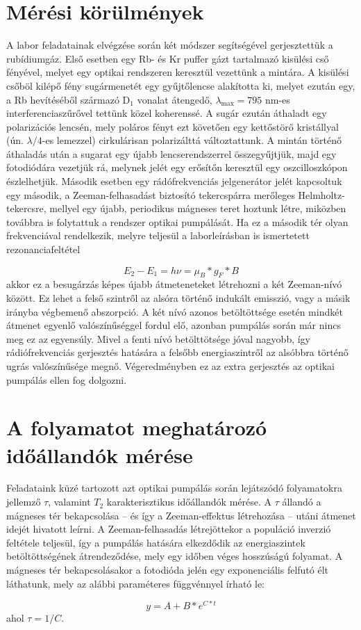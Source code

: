 \begin{multicols}{2}
\section{Mérési körülmények}
A labor feladatainak elvégzése során két módszer segítségével gerjesztettük a rubídiumgáz. Első esetben egy Rb- és Kr puffer gázt tartalmazó kisülési cső fényével, melyet egy optikai rendszeren keresztül vezettünk a mintára. A kisülési csőböl kilépő fény sugármenetét egy gyűjtőlencse alakította ki, melyet ezután egy, a Rb hevítéséből származó D$_{1}$ vonalat átengedő, $\lambda_{\text{max}} = 795$ nm-es interferenciaszűrővel tettünk közel koherenssé. A sugár ezután áthaladt egy polarizációs lencsén, mely poláros fényt ezt követően egy kettőstörő kristállyal (ún. $\lambda/4$-es lemezzel) cirkulárisan polarizálttá változtattunk. A mintán történő áthaladás után a sugarat egy újabb lencserendszerrel összegyűjtjük, majd egy fotodiódára vezetjük rá, melynek jelét egy erősítőn keresztül egy oszcilloszkópon észlelhetjük. \newline
Második esetben egy rádófrekvenciás jelgenerátor jelét kapcsoltuk egy második, a Zeeman-felhasadást biztosító tekercspárra merőleges Helmholtz-tekercsre, mellyel egy újabb, periodikus mágneses teret hoztunk létre, miközben továbbra is folytattuk a rendszer optikai pumpálását. Ha ez a második tér olyan frekvenciával rendelkezik, melyre teljesül a laborleírásban is ismertetett rezonanciafeltétel

\begin{equation}
E_{2} - E_{1}
=
h \nu
=
\mu_{B} * g_{F} * B
\end{equation}
akkor ez a besugárzás képes újabb átmeteneteket létrehozni a két Zeeman-nívó között. Ez lehet a felső szintről az alsóra történő indukált emisszió, vagy a másik irányba végbemenő abszorpció. A két nívó azonos betöltöttsége esetén mindkét átmenet egyenlő valószínűséggel fordul elő, azonban pumpálás során már nincs meg ez az egyensúly. Mivel a fenti nívó betölttötsége jóval nagyobb, így rádiófrekvenciás gerjesztés hatására a felsőbb energiaszintről az alsóbbra történő ugrás valószínűsége megnő. Végeredményben ez az extra gerjesztés az optikai pumpálás ellen fog dolgozni.

\section{A folyamatot meghatározó időállandók mérése}
Feladataink küzé tartozott azt optikai pumpálás során lejátszódó folyamatokra jellemző $\tau$, valamint $T_{2}$ karakterisztikus időállandók mérése. A $\tau$ állandó a mágneses tér bekapcsolása -- és így a Zeeman-effektus létrehozása -- utáni átmenet idejét hivatott leírni. A Zeeman-felhasadás létrejöttekor a populáció inverzió feltétele teljesül, így a pumpálás hatására elkezdődik az energiaszintek betöltöttségének átrendeződése, mely egy időben véges hosszúságú folyamat. A mágneses tér bekapcsolásakor a fotodióda jelén egy exponenciális felfutó élt láthatunk, mely az alábbi paraméteres függvénnyel írható le:

\begin{equation}
y
=
A + B * e^{C * t}
\end{equation}
ahol $\tau = 1/C$.

\end{multicols}